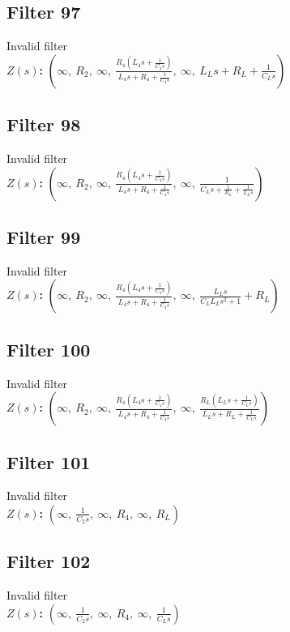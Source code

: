 \documentclass{article}
\begin{document}
\subsection*{Filter 97}
Invalid filter \\ 
\textbf{$Z(s)$:} $\left( \infty, \  R_{2}, \  \infty, \  \frac{R_{4} \left(L_{4} s + \frac{1}{C_{4} s}\right)}{L_{4} s + R_{4} + \frac{1}{C_{4} s}}, \  \infty, \  L_{L} s + R_{L} + \frac{1}{C_{L} s}\right)$ \\ 
\subsection*{Filter 98}
Invalid filter \\ 
\textbf{$Z(s)$:} $\left( \infty, \  R_{2}, \  \infty, \  \frac{R_{4} \left(L_{4} s + \frac{1}{C_{4} s}\right)}{L_{4} s + R_{4} + \frac{1}{C_{4} s}}, \  \infty, \  \frac{1}{C_{L} s + \frac{1}{R_{L}} + \frac{1}{L_{L} s}}\right)$ \\ 
\subsection*{Filter 99}
Invalid filter \\ 
\textbf{$Z(s)$:} $\left( \infty, \  R_{2}, \  \infty, \  \frac{R_{4} \left(L_{4} s + \frac{1}{C_{4} s}\right)}{L_{4} s + R_{4} + \frac{1}{C_{4} s}}, \  \infty, \  \frac{L_{L} s}{C_{L} L_{L} s^{2} + 1} + R_{L}\right)$ \\ 
\subsection*{Filter 100}
Invalid filter \\ 
\textbf{$Z(s)$:} $\left( \infty, \  R_{2}, \  \infty, \  \frac{R_{4} \left(L_{4} s + \frac{1}{C_{4} s}\right)}{L_{4} s + R_{4} + \frac{1}{C_{4} s}}, \  \infty, \  \frac{R_{L} \left(L_{L} s + \frac{1}{C_{L} s}\right)}{L_{L} s + R_{L} + \frac{1}{C_{L} s}}\right)$ \\ 
\subsection*{Filter 101}
Invalid filter \\ 
\textbf{$Z(s)$:} $\left( \infty, \  \frac{1}{C_{2} s}, \  \infty, \  R_{4}, \  \infty, \  R_{L}\right)$ \\ 
\subsection*{Filter 102}
Invalid filter \\ 
\textbf{$Z(s)$:} $\left( \infty, \  \frac{1}{C_{2} s}, \  \infty, \  R_{4}, \  \infty, \  \frac{1}{C_{L} s}\right)$ \\ 
\end{document}
